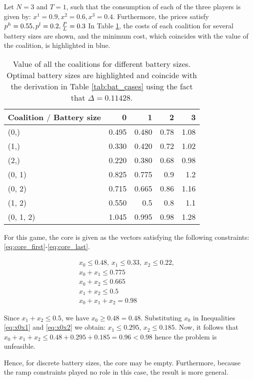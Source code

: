 \begin{example}\label{ex:emptycore}

Let $N = 3$ and $T=1$, such that the consumption of each of the three players is given by: $x^1 = 0.9, x^2 = 0.6, x^3 = 0.4$. Furthermore, the prices satisfy $p^h = 0.55, p^l = 0.2, \frac{P}{L} = 0.3$
In Table \ref{tab:cost_coalitions}, the costs of each coalition for several battery sizes are shown, and the minimum cost, which coincides with the value of the coalition, is highlighted in blue. 


\begin{table}[htpb]
	\centering
	\caption{Value of all the coalitions for different battery sizes. Optimal battery sizes are highlighted and coincide with the derivation in Table \ref{tab:bat_cases} using the fact that $\Delta = 0.11428$.}
	\label{tab:cost_coalitions}
	\begin{tabular}{lrrrr}
\toprule
Coalition $\slash$ Battery size &      0 &      1 &     2 &     3  \\
\midrule
(0,)      &  0.495 & \cellcolor{blue!25} 0.480 &  0.78 &  1.08 \\
(1,)      &  \cellcolor{blue!25} 0.330 &  0.420 &  0.72 &  1.02\\
(2,)      &  \cellcolor{blue!25} 0.220 &  0.380 &  0.68 &  0.98\\
(0, 1)    &  0.825 &  \cellcolor{blue!25} 0.775 &  0.9 &  1.2 \\
(0, 2)    &  0.715 &  \cellcolor{blue!25} 0.665 &  0.86 &  1.16\\
(1, 2)    &  0.550 &  \cellcolor{blue!25} 0.5 &  0.8 &  1.1 \\
(0, 1, 2) &  1.045 &  0.995 &  \cellcolor{blue!25} 0.98 &  1.28\\
\bottomrule
\end{tabular}
\end{table}

For this game, the core is given as the vectors satisfying the following constraints: \eqref{eq:core_first}-\eqref{eq:core_last}.

\begin{gather}
x_0 \leq 0.48, \  x_1 \leq 0.33, \ x_2 \leq 0.22, \label{eq:core_first}\\
x_0 + x_1 \leq 0.775 \label{eq:x0x1}\\
x_0 + x_2 \leq 0.665 \label{eq:x0x2}\\
x_1 + x_2 \leq 0.5 \\
x_0 + x_1 + x_2 = 0.98 \label{eq:core_last}
\end{gather}


Since $x_1 + x_2 \leq 0.5$, we have $x_0 \geq 0.48 = 0.48$. Substituting $x_0$ in Inequalities \eqref{eq:x0x1} and \eqref{eq:x0x2} we obtain: $x_1 \leq  0.295$, $x_2 \leq 0.185$. Now, it follows that $x_0 + x_1 + x_2 \leq 0.48 + 0.295 + 0.185 = 0.96 < 0.98$ hence the problem is unfeasible.

Hence, for discrete battery sizes, the core may be empty. Furthermore, because the ramp constraints played no role in this case, the result is more general.
\end{example}



